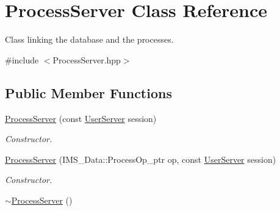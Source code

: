 \hypertarget{classProcessServer}{
\section{ProcessServer Class Reference}
\label{classProcessServer}
}


Class linking the database and the processes.  




{\ttfamily \#include $<$ProcessServer.hpp$>$}

\subsection*{Public Member Functions}
\begin{DoxyCompactItemize}
\item 
\hypertarget{classProcessServer_a3e1ecbbc2ac00c59c35a15d6cc1ae6e6}{
\hyperlink{classProcessServer_a3e1ecbbc2ac00c59c35a15d6cc1ae6e6}{ProcessServer} (const \hyperlink{classUserServer}{UserServer} session)}
\label{classProcessServer_a3e1ecbbc2ac00c59c35a15d6cc1ae6e6}

\begin{DoxyCompactList}\small\item\em Constructor. \item\end{DoxyCompactList}\item 
\hypertarget{classProcessServer_a47eab90d27efe17a9bb19294477743d2}{
\hyperlink{classProcessServer_a47eab90d27efe17a9bb19294477743d2}{ProcessServer} (IMS\_\-Data::ProcessOp\_\-ptr op, const \hyperlink{classUserServer}{UserServer} session)}
\label{classProcessServer_a47eab90d27efe17a9bb19294477743d2}

\begin{DoxyCompactList}\small\item\em Constructor. \item\end{DoxyCompactList}\item 
\hypertarget{classProcessServer_a2cde590e023e93992adeb7ca1728ed19}{
\hyperlink{classProcessServer_a2cde590e023e93992adeb7ca1728ed19}{$\sim$ProcessServer} ()}
\label{classProcessServer_a2cde590e023e93992adeb7ca1728ed19}


\end{DoxyCompactItemize}
